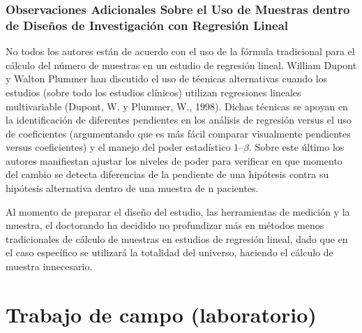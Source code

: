 \subsubsection{Observaciones Adicionales Sobre el Uso de Muestras dentro de Diseños de Investigación con Regresión Lineal}
No todos los autores están de acuerdo con el uso de la fórmula tradicional para el cálculo del número de muestras en un estudio de regresión lineal. William Dupont y Walton Plummer han discutido el uso de técnicas alternativas cuando los estudios (sobre todo los estudios clínicos) utilizan regresiones lineales multivariable (Dupont, W. y Plummer, W., 1998). Dichas técnicas se apoyan en la identificación de diferentes pendientes en los análisis de regresión versus el uso de coeficientes (argumentando que es más fácil comparar visualmente pendientes versus coeficientes) y el manejo del poder estadístico $1 – \beta$. Sobre este último los autores manifiestan ajustar los niveles de poder para verificar en que momento del cambio se detecta diferencias de la pendiente de una hipótesis contra su hipótesis alternativa dentro de una muestra de n pacientes. 

Al momento de preparar el diseño del estudio, las herramientas de medición y la muestra, el doctorando ha decidido no profundizar más en métodos menos tradicionales de cálculo de muestras en estudios de regresión lineal, dado que en el caso específico se utilizará la totalidad del universo, haciendo el cálculo de muestra innecesario. 

\section{Trabajo de campo (laboratorio)}

